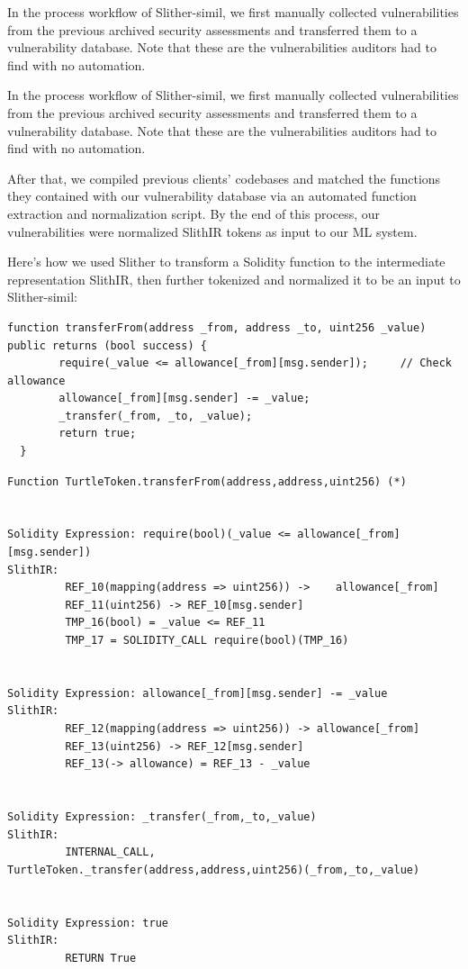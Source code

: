 In the process workflow of Slither-simil, we first manually collected vulnerabilities from the previous archived security assessments and transferred them to a vulnerability database.
Note that these are the vulnerabilities auditors had to find with no automation.

In the process workflow of Slither-simil, we first manually collected vulnerabilities from the previous archived security assessments and transferred them to a vulnerability database.
Note that these are the vulnerabilities auditors had to find with no automation.

After that, we compiled previous clients' codebases and matched the functions they contained with our vulnerability database via an automated function extraction and normalization script.
By the end of this process, our vulnerabilities were normalized SlithIR tokens as input to our ML system.

Here's how we used Slither to transform a Solidity function to the intermediate representation SlithIR, then further tokenized and normalized it to be an input to Slither-simil:

\begin{lstlisting}[float,caption= complete Solidity function from the contract TurtleToken.sol., escapechar=\%, language=Solidity, label=lst:solidity-bug]
  function transferFrom(address _from, address _to, uint256 _value) public returns (bool success) {
        require(_value <= allowance[_from][msg.sender]);     // Check allowance
        allowance[_from][msg.sender] -= _value;
        _transfer(_from, _to, _value);
        return true;
  }
  \end{lstlisting}

  \begin{lstlisting}[float,caption= The same function with its SlithIR expressions printed out., escapechar=\%, language=Solidity, label=lst:solidity-bug]
Function TurtleToken.transferFrom(address,address,uint256) (*)
 
 
Solidity Expression: require(bool)(_value <= allowance[_from][msg.sender])
SlithIR: 
         REF_10(mapping(address => uint256)) ->    allowance[_from]
         REF_11(uint256) -> REF_10[msg.sender]
         TMP_16(bool) = _value <= REF_11
         TMP_17 = SOLIDITY_CALL require(bool)(TMP_16)
 
 
Solidity Expression: allowance[_from][msg.sender] -= _value
SlithIR: 
         REF_12(mapping(address => uint256)) -> allowance[_from]
         REF_13(uint256) -> REF_12[msg.sender]
         REF_13(-> allowance) = REF_13 - _value
 
 
Solidity Expression: _transfer(_from,_to,_value)
SlithIR: 
         INTERNAL_CALL,      TurtleToken._transfer(address,address,uint256)(_from,_to,_value)
 
 
Solidity Expression: true
SlithIR: 
         RETURN True
    \end{lstlisting}



